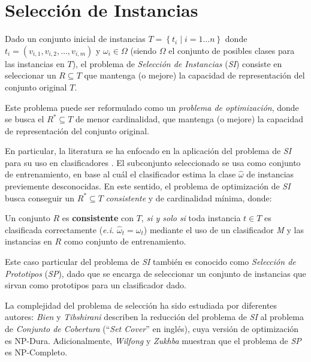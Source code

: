\section{Selección de Instancias}

Dado un conjunto inicial de instancias $T = \left\{ t_i \mid i = 1 \dots n \right\}$ donde\linebreak $t_i = (v_{i,1}, v_{i,2}, \dots, v_{i,m})$ y $\omega_i \in \Omega$ (siendo $\Omega$ el conjunto de posibles clases para las instancias en $T$), el problema de \emph{Selección de Instancias} (\emph{SI}) consiste en seleccionar un $R \subseteq T$ que mantenga (o mejore) la capacidad de representación del conjunto original $T$.

Este problema puede ser reformulado como un \emph{problema de optimización}, donde se busca el $R^* \subseteq T$ de menor cardinalidad, que mantenga (o mejore) la capacidad de representación del conjunto original.

En particular, la literatura se ha enfocado en la aplicación del problema de \emph{SI} para su uso en clasificadores \cite{DBLP:journals/corr/GottliebK14,DBLP:conf/jcdcg/Toussaint02}. El subconjunto seleccionado se usa como conjunto de entrenamiento, en base al cuál el clasificador estima la clase $\hat{\omega}$ de instancias previemente desconocidas. En este sentido, el problema de optimización de \emph{SI} busca conseguir un $R^* \subseteq T$ \emph{consistente} y de cardinalidad mínima, donde:

\begin{definicion}
Un conjunto $R$ es \textbf{consistente} con $T$, \emph{si y solo si} toda instancia $t \in T$ es clasificada correctamente (\emph{e.i.} $\hat{\omega}_t = \omega_t$) mediante el uso de un clasificador \emph{M} y las instancias en $R$ como conjunto de entrenamiento.
\end{definicion}

Este caso particular del problema de \emph{SI} también es conocido como \emph{Selección de Prototipos} (\emph{SP}), dado que se encarga de seleccionar un conjunto de instancias que sirvan como prototipos para un clasificador dado.

La complejidad del problema de selección ha sido estudiada por diferentes autores: \emph{Bien} y \emph{Tibshirani} \cite{2012arXiv1202.5933B} describen la reducción del problema de \emph{SI} al problema de \emph{Conjunto de Cobertura} (``\emph{Set Cover}'' en inglés), cuya versión de optimización es NP-Dura. Adicionalmente, \emph{Wilfong} \cite{Wilfong:1991:NNP:109648.109673} y  \emph{Zukhba} \cite{Zukhba:2010:NPP:1921730.1921735} muestran que el problema de \emph{SP} es {\color{red}NP-Completo}.

